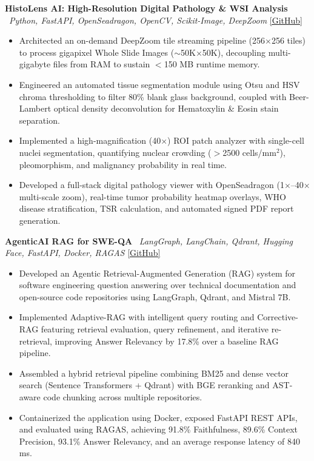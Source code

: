 \documentclass[a4paper,10pt]{article}
\begin{document}
\textbf{HistoLens AI: High-Resolution Digital Pathology \& WSI Analysis} \textbar\ \textit{Python, FastAPI, OpenSeadragon, OpenCV, Scikit-Image, DeepZoom} \hfill \href{https://github.com/BST1807}{[GitHub]}
\begin{itemize}
    \item Architected an on-demand DeepZoom tile streaming pipeline (256$\times$256 tiles) to process gigapixel Whole Slide Images ($\sim$50K$\times$50K), decoupling multi-gigabyte files from RAM to sustain $<$150 MB runtime memory.
    \item Engineered an automated tissue segmentation module using Otsu and HSV chroma thresholding to filter 80\% blank glass background, coupled with Beer-Lambert optical density deconvolution for Hematoxylin \& Eosin stain separation.
    \item Implemented a high-magnification (40$\times$) ROI patch analyzer with single-cell nuclei segmentation, quantifying nuclear crowding ($>$2500 cells/mm$^2$), pleomorphism, and malignancy probability in real time.
    \item Developed a full-stack digital pathology viewer with OpenSeadragon (1$\times$--40$\times$ multi-scale zoom), real-time tumor probability heatmap overlays, WHO disease stratification, TSR calculation, and automated signed PDF report generation.
\end{itemize}

\vspace{3pt}
\textbf{AgenticAI RAG for SWE-QA} \textbar\ \textit{LangGraph, LangChain, Qdrant, Hugging Face, FastAPI, Docker, RAGAS} \hfill \href{https://github.com/BST1807}{[GitHub]}
\begin{itemize}
    \item Developed an Agentic Retrieval-Augmented Generation (RAG) system for software engineering question answering over technical documentation and open-source code repositories using LangGraph, Qdrant, and Mistral 7B.
    \item Implemented Adaptive-RAG with intelligent query routing and Corrective-RAG featuring retrieval evaluation, query refinement, and iterative re-retrieval, improving Answer Relevancy by 17.8\% over a baseline RAG pipeline.
    \item Assembled a hybrid retrieval pipeline combining BM25 and dense vector search (Sentence Transformers + Qdrant) with BGE reranking and AST-aware code chunking across multiple repositories.
    \item Containerized the application using Docker, exposed FastAPI REST APIs, and evaluated using RAGAS, achieving 91.8\% Faithfulness, 89.6\% Context Precision, 93.1\% Answer Relevancy, and an average response latency of 840 ms.
\end{itemize}
\end{document}
